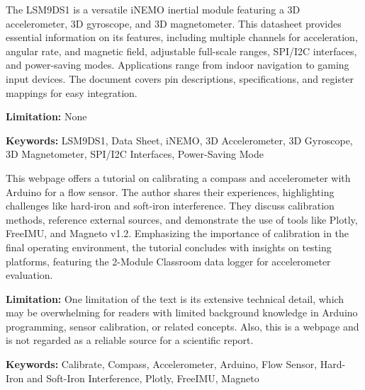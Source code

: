 { 
	The LSM9DS1 is a versatile iNEMO inertial module featuring a 3D accelerometer, 3D gyroscope, and 3D magnetometer. This datasheet \cite{LSM9DS1:2015} provides essential information on its features, including multiple channels for acceleration, angular rate, and magnetic field, adjustable full-scale ranges, SPI/I2C interfaces, and power-saving modes. Applications range from indoor navigation to gaming input devices. The document covers pin descriptions, specifications, and register mappings for easy integration. 
	
	\bigskip
	
	\textbf{Limitation:} None
	
	\scriptsize{\textbf{Keywords:} LSM9DS1, Data Sheet, iNEMO, 3D Accelerometer, 3D Gyroscope, 3D Magnetometer, SPI/I2C Interfaces, Power-Saving Mode}
}


{ 
	This webpage \cite{Mallon:2015} offers a tutorial on calibrating a compass and accelerometer with Arduino for a flow sensor. The author shares their experiences, highlighting challenges like hard-iron and soft-iron interference. They discuss calibration methods, reference external sources, and demonstrate the use of tools like Plotly, FreeIMU, and Magneto v1.2. Emphasizing the importance of calibration in the final operating environment, the tutorial concludes with insights on testing platforms, featuring the 2-Module Classroom data logger for accelerometer evaluation.
	
	\bigskip
	
	\textbf{Limitation:} One limitation of the text is its extensive technical detail, which may be overwhelming for readers with limited background knowledge in Arduino programming, sensor calibration, or related concepts. Also, this is a webpage and is not regarded as a reliable source for a scientific report.
	
	\scriptsize{\textbf{Keywords:} Calibrate, Compass, Accelerometer, Arduino, Flow Sensor, Hard-Iron and Soft-Iron Interference, Plotly, FreeIMU, Magneto}
}


